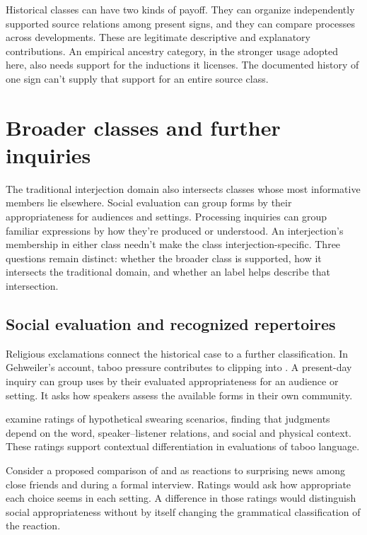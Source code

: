 \documentclass[12pt]{article}
\begin{document}
Historical classes can have two kinds of payoff. They can
organize independently supported source relations among present signs,
and they can compare processes across developments. These are legitimate
descriptive and explanatory contributions. An empirical ancestry category,
in the stronger usage adopted here, also needs support for the
inductions it licenses. The documented history of one sign can't supply
that support for an entire source class.

\section{Broader classes and further inquiries}\label{sec:extensions}

The traditional interjection domain also intersects classes whose most
informative members lie elsewhere. Social evaluation can group forms
by their appropriateness for audiences and settings. Processing inquiries
can group familiar expressions by how they're produced or understood.
An interjection's membership in either class needn't make the class
interjection-specific. Three questions remain distinct: whether the
broader class is supported, how it intersects the traditional domain,
and whether an  label helps describe that intersection.

\subsection{Social evaluation and recognized repertoires}

Religious exclamations connect the historical case to a further classification.
In Gehweiler's account, taboo pressure contributes to clipping 
into . A present-day inquiry can group uses by their
evaluated appropriateness for an audience or setting. It asks how
speakers assess the available forms in their own community.

\textcite{jayjanschewitz2008} examine ratings of hypothetical swearing scenarios,
finding that judgments depend on the word, speaker--listener relations,
and social and physical context. These ratings support contextual
differentiation in evaluations of taboo language.

Consider a proposed comparison of  and 
as reactions to surprising news among close friends and during a
formal interview. Ratings would ask how appropriate each choice seems
in each setting. A difference in those ratings would distinguish
social appropriateness without by itself changing the grammatical classification
of the reaction.
\end{document}
